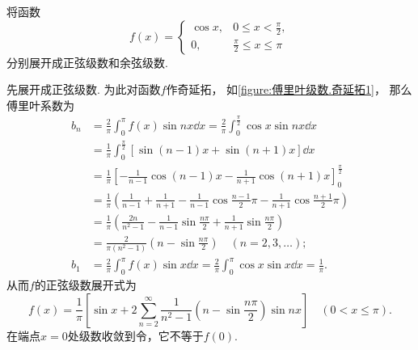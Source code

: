 \begin{example}
将函数\[
	f(x) = \left\{ \begin{array}{cc}
		\cos x, & 0 \leq x < \frac{\pi}{2}, \\
		0, & \frac{\pi}{2} \leq x \leq \pi
	\end{array} \right.
\]分别展开成正弦级数和余弦级数.
\begin{solution}
先展开成正弦级数.
为此对函数\(f\)作奇延拓，
如\cref{figure:傅里叶级数.奇延拓1}，
那么傅里叶系数为\begin{align*}
	b_n &= \frac{2}{\pi} \int_0^\pi f(x) \sin nx \dd{x}
	= \frac{2}{\pi}
		\int_0^{\frac{\pi}{2}} \cos x \sin nx \dd{x} \\
	&= \frac{1}{\pi}
		\int_0^{\frac{\pi}{2}} [\sin(n-1)x + \sin(n+1)x] \dd{x} \\
	&= \frac{1}{\pi}
		\left[
			-\frac{1}{n-1} \cos(n-1)x - \frac{1}{n+1} \cos(n+1)x
		\right]_0^{\frac{\pi}{2}} \\
	&= \frac{1}{\pi}
		\left(
			\frac{1}{n-1}
			+ \frac{1}{n+1}
			- \frac{1}{n-1} \cos\frac{n-1}{2}\pi
			- \frac{1}{n+1} \cos\frac{n+1}{2}\pi
		\right) \\
	&= \frac{1}{\pi}
		\left(
			\frac{2n}{n^2-1}
			- \frac{1}{n-1}
			\sin\frac{n\pi}{2}
			+ \frac{1}{n+1}\sin\frac{n\pi}{2}
		\right) \\
	&= \frac{2}{\pi(n^2-1)} \left(n-\sin\frac{n\pi}{2}\right)
		\quad(n=2,3,\dotsc); \\
	b_1 &= \frac{2}{\pi} \int_0^\pi f(x) \sin x \dd{x}
	= \frac{2}{\pi} \int_0^\pi \cos x \sin x \dd{x} = \frac{1}{\pi}.
\end{align*}
从而\(f\)的正弦级数展开式为\[
f(x) = \frac{1}{\pi} \left[
		\sin x
		+ 2\sum_{n=2}^\infty
			\frac{1}{n^2-1} \left(n-\sin\frac{n\pi}{2}\right) \sin nx
	\right]
	\quad(0 < x \leq \pi).
\]
在端点\(x=0\)处级数收敛到令，它不等于\(f(0)\).


\end{solution}
\end{example}
